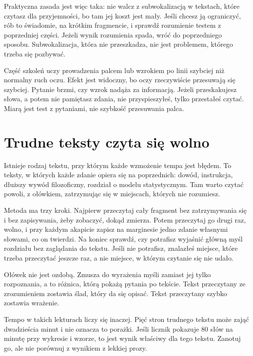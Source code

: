 Praktyczna zasada jest więc taka: nie walcz z subwokalizacją w tekstach, które czytasz dla przyjemności, bo tam jej koszt jest mały. Jeśli chcesz ją ograniczyć, rób to świadomie, na krótkim fragmencie, i sprawdź rozumienie testem z poprzedniej części. Jeżeli wynik rozumienia spada, wróć do poprzedniego sposobu. Subwokalizacja, która nie przeszkadza, nie jest problemem, którego trzeba się pozbywać.

\begin{falle}
Część szkoleń uczy prowadzenia palcem lub wzrokiem po linii szybciej niż normalny ruch oczu. Efekt jest widoczny, bo oczy rzeczywiście przesuwają się szybciej. Pytanie brzmi, czy wzrok nadąża za informacją. Jeżeli przeskakujesz słowa, a potem nie pamiętasz zdania, nie przyspieszyłeś, tylko przestałeś czytać. Miarą jest test z pytaniami, nie szybkość przesuwania palca.
\end{falle}

\section{Trudne teksty czyta się wolno}

Istnieje rodzaj tekstu, przy którym każde wzmożenie tempa jest błędem. To teksty, w których każde zdanie opiera się na poprzednich: dowód, instrukcja, dłuższy wywód filozoficzny, rozdział o modelu statystycznym. Tam warto czytać powoli, z ołówkiem, zatrzymując się w miejscach, których nie rozumiesz.

Metoda ma trzy kroki. Najpierw przeczytaj cały fragment bez zatrzymywania się i bez zapisywania, żeby zobaczyć, dokąd zmierza. Potem przeczytaj go drugi raz, wolno, i przy każdym akapicie zapisz na marginesie jedno zdanie własnymi słowami, co on twierdzi. Na koniec sprawdź, czy potrafisz wyjaśnić główną myśl rozdziału bez zaglądania do tekstu. Jeśli nie potrafisz, znalazłeś miejsce, które trzeba przeczytać jeszcze raz, a nie miejsce, w którym czytanie się nie udało.

Ołówek nie jest ozdobą. Zmusza do wyrażenia myśli zamiast jej tylko rozpoznania, a to różnica, którą pokażą pytania po tekście. Tekst przeczytany ze zrozumieniem zostawia ślad, który da się opisać. Tekst przeczytany szybko zostawia wrażenie.

Tempo w takich lekturach liczy się inaczej. Pięć stron trudnego tekstu może zająć dwadzieścia minut i nie oznacza to porażki. Jeśli licznik pokazuje 80 słów na minutę przy wykresie i wzorze, to jest wynik właściwy dla tego tekstu. Zanotuj go, ale nie porównuj z wynikiem z lekkiej prozy.

